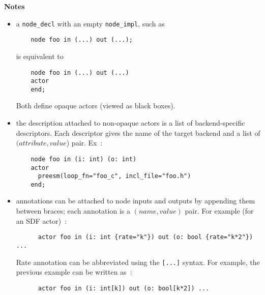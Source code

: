 \textbf{Notes}
\begin{itemize}

\item a \verb|node_decl| with an empty \verb|node_impl|, such as
  \begin{lstlisting}
    node foo in (...) out (...);
  \end{lstlisting}
is equivalent to
  \begin{lstlisting}
    node foo in (...) out (...)
    actor
    end;
  \end{lstlisting}
Both define opaque actors (viewed as black boxes).

\item the description attached to non-opaque actors is a list of backend-specific descriptors. Each
  descriptor gives the name of the target backend and a list of $(attribute,value$) pair. Ex~:
  \begin{lstlisting}
    node foo in (i: int) (o: int)
    actor
      preesm(loop_fn="foo_c", incl_file="foo.h")
    end;
  \end{lstlisting}

\item annotations can be attached to node inputs and outputs by appending them between braces; each
  annotation is a $(name,value)$ pair. For example (for an SDF actor)~:
    \begin{lstlisting}
      actor foo in (i: int {rate="k"}) out (o: bool {rate="k*2"}) ...
    \end{lstlisting}
  Rate annotation can be abbreviated using the \verb|[...]| syntax. For example, the previous
  example can be written as~:
    \begin{lstlisting}
      actor foo in (i: int[k]) out (o: bool[k*2]) ...
    \end{lstlisting}

\end{itemize}
